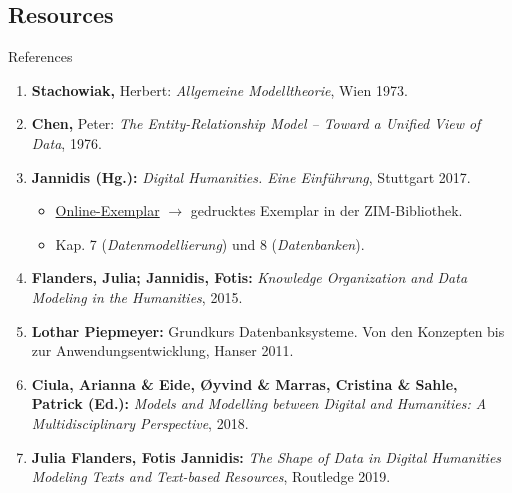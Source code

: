 \subsection{Resources}
\begin{frame}{References}
\begin{enumerate}
    \item \textbf{Stachowiak,} Herbert: \emph{Allgemeine Modelltheorie}, Wien 1973. 
    \item \textbf{Chen,} Peter: \emph{The Entity-Relationship Model -- Toward a Unified View of Data}, 1976.
    \item \textbf{Jannidis (Hg.):} \emph{Digital Humanities. Eine Einführung}, Stuttgart 2017. \\
    \begin{itemize}
        \item \href{https://link.springer.com/book/10.1007/978-3-476-05446-3}{Online-Exemplar} $\to$ gedrucktes Exemplar in der ZIM-Bibliothek.
        \item Kap. 7 (\emph{Datenmodellierung}) und 8 (\emph{Datenbanken}).
    \end{itemize}
    \item \textbf{Flanders, Julia; Jannidis, Fotis:} \emph{Knowledge Organization and Data Modeling in the Humanities}, 2015. 
    \item \textbf{Lothar Piepmeyer:} Grundkurs Datenbanksysteme. Von den Konzepten bis zur Anwendungsentwicklung, Hanser 2011. 
    \item \textbf{Ciula, Arianna \& Eide, Øyvind \& Marras, Cristina \& Sahle, Patrick (Ed.):} \emph{Models and Modelling between Digital and Humanities: A Multidisciplinary Perspective}, 2018.
    \item \textbf{Julia Flanders, Fotis Jannidis:} \emph{The Shape of Data in Digital Humanities Modeling Texts and Text-based Resources}, Routledge 2019.
\end{enumerate}

\end{frame}


